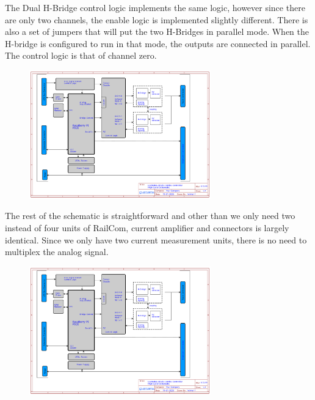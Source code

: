 The Dual H-Bridge control logic implements the same logic, however since there are only two channels, the enable logic is implemented slightly different. There is also a set of jumpers that will put the two H-Bridges in parallel mode. When the H-bridge is configured to run in that mode, the outputs are connected in parallel. The control logic is that of channel zero.

\begin{figure}[htbp]
    \centering
    \includegraphics[page=4, width=0.7\textwidth]{./Schematics/Schematic_LcsNodes-Block-Combo-Controller.pdf}
\end{figure}
\FloatBarrier

The rest of the schematic is straightforward and other than we only need two instead of four units of RailCom, current amplifier and connectors is largely identical. Since we only have two current measurement units, there is no need to multiplex the analog signal. 

\begin{figure}[htbp]
    \centering
    \includegraphics[page=5, width=0.7\textwidth]{./Schematics/Schematic_LcsNodes-Block-Combo-Controller.pdf}
\end{figure}
\FloatBarrier

